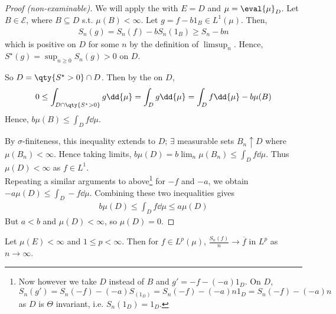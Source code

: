 \begin{proof}[Proof (non-examinable)]
	We will apply the  with $E = D$ and $\mu = \eval{\mu}_D$.
    Let $B \in \mathcal E$, where $B \subseteq D$ s.t. $\mu(B) < \infty$.
    Let $g = f - b 1_B \in L^1(\mu)$.
    Then,
    \begin{align*}
        S_n(g) = S_n(f) - bS_n(1_B) \geq S_n - bn
    \end{align*}
    which is positive on $D$ for some $n$ by the definition of $\limsup_n$.
	Hence, $S^\star(g) = \sup_{n \geq 0} S_n(g) > 0$ on $D$.

    So $D = \qty{S^\star > 0} \cap D$.
    Then by the  on $D$,
    \begin{align*}
        0 \leq \int_{D \cap \qty{S^\star > 0}} g \dd{\mu} = \int_D g \dd{\mu} = \int_D f \dd{\mu} - b \mu(B)
    \end{align*}
    Hence, $b \mu(B) \leq \int_D f \dd{\mu}$.

    By $\sigma$-finiteness, this inequality extends to $D$; $\exists$ measurable sets $B_n \uparrow D$ where $\mu(B_n) < \infty$.
	Hence taking limits, $b\mu(D) = b \lim_n \mu(B_n) \leq \int_D f \dd{\mu}$.
	Thus $\mu(D) < \infty$ as $f \in L^1$. \\
    Repeating a similar arguments to above\footnote{Now however we take $D$ instead of $B$ and $g' = -f - (-a) 1_D$. On $D$, $S_n(g') = S_n(-f) - (-a) S_(1_D) = S_n(-f) - (-a) n 1_D = S_n(-f) - (-a)n$ as $D$ is $\Theta$ invariant, i.e. $S_n(1_D) = 1_D$.} for $-f$ and $-a$, we obtain $-a\mu(D) \leq \int_D -f \dd{\mu}$.
    Combining these two inequalities gives
    \begin{align*}
        b\mu(D) \leq \int_D f \dd{\mu} \leq a\mu(D)
    \end{align*}
    But $a < b$ and $\mu(D) < \infty$, so $\mu(D) = 0$.
\end{proof}

\begin{theorem}
	Let $\mu(E) < \infty$ and $1 \leq p < \infty$.
	Then for $f \in L^p(\mu)$, $\frac{S_n(f)}{n} \to \overline f$ in $L^p$ as $n \to \infty$.
\end{theorem}

